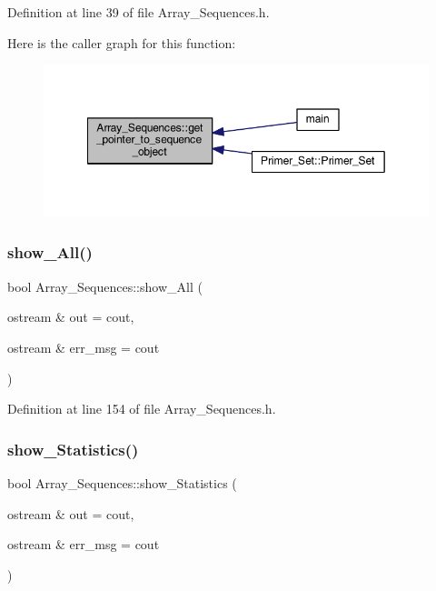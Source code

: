 Definition at line 39 of file Array\+\_\+\+Sequences.\+h.

Here is the caller graph for this function\+:
\nopagebreak
\begin{figure}[H]
\begin{center}
\leavevmode
\includegraphics[width=349pt]{class_array___sequences_a029592cf35f56df0714e5326a3901b74_icgraph}
\end{center}
\end{figure}
\mbox{\label{class_array___sequences_ad197ef5c061d0cfc564afe5504fa4961}} 
\subsubsection{\texorpdfstring{show\+\_\+\+All()}{show\_All()}}
{\footnotesize\ttfamily bool Array\+\_\+\+Sequences\+::show\+\_\+\+All (\begin{DoxyParamCaption}\item[{ostream \&}]{out = {\ttfamily cout},  }\item[{ostream \&}]{err\+\_\+msg = {\ttfamily cout} }\end{DoxyParamCaption})}



Definition at line 154 of file Array\+\_\+\+Sequences.\+h.

\mbox{\label{class_array___sequences_ab0735daa57cd712e08843e9c79e40488}} 
\subsubsection{\texorpdfstring{show\+\_\+\+Statistics()}{show\_Statistics()}}
{\footnotesize\ttfamily bool Array\+\_\+\+Sequences\+::show\+\_\+\+Statistics (\begin{DoxyParamCaption}\item[{ostream \&}]{out = {\ttfamily cout},  }\item[{ostream \&}]{err\+\_\+msg = {\ttfamily cout} }\end{DoxyParamCaption})}



